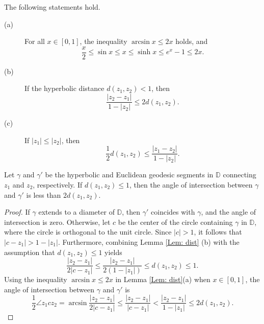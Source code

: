 \documentclass[10pt,a4paper]{amsart}
\begin{document}
\begin{lemma}\label{Lem: dist}
The following statements hold.
\begin{description}
\item[(a)]
For all $x\in[0, 1]$, the inequality $\arcsin x\leq 2x$ holds, and 
\begin{equation*}
\frac{x}{2}\leq \sin x \leq x\leq \sinh x\leq e^x - 1\leq 2x.
\end{equation*}
\item[(b)]
If the hyperbolic distance $d(z_1, z_2)<1$, then
\begin{equation*}
\frac{|z_2-z_1|}{1-|z_2|} \leq 2d(z_1, z_2).
\end{equation*}

\item[(c)]
If $|z_1|\leq |z_2|$, then
\begin{equation*}
\frac{1}{2}d(z_1, z_2) \leq \frac{|z_1-z_2|}{1-|z_2|}.
\end{equation*}
\end{description}
\end{lemma}

\begin{lemma}\label{angle}
Let $\gamma$ and $\gamma'$ be the hyperbolic and Euclidean geodesic segments in $\mathbb{D}$ connecting $z_1$ and $z_2$, respectively.
If $d(z_1, z_2)\leq 1$, then the angle of intersection between $\gamma$ and $\gamma'$ is less than $2d(z_1, z_2)$.
\end{lemma}

\begin{proof}
If $\gamma$ extends to a diameter of $\mathbb{D}$, then $\gamma'$ coincides with $\gamma$, and the angle of intersection is zero.
Otherwise, let $c$ be the center of the circle containing $\gamma$ in $\mathbb{D}$, where the circle is orthogonal to the unit circle.
Since $|c|>1$, it follows that $|c-z_1|>1-|z_1|$.
Furthermore, combining Lemma \ref{Lem: dist} (b) with the assumption that $d(z_1,z_2)\leq 1$ yields
\begin{equation*}
\frac{|z_2-z_1|}{2|c-z_1|}
\leq \frac{|z_2-z_1|}{2(1-|z_1|)}
\leq d(z_1, z_2)\leq 1.
\end{equation*}
Using the inequality $\arcsin x \leq 2x$ in Lemma \ref{Lem: dist}(a) when $x\in [0, 1]$, the angle of intersection between $\gamma$ and $\gamma'$ is
\begin{equation*}
\frac{1}{2}\angle z_1cz_2
=\arcsin \frac{|z_2-z_1|}{2|c-z_1|}
\leq \frac{|z_2-z_1|}{|c-z_1|}
<\frac{|z_2-z_1|}{1-|z_1|}
\leq 2d(z_1,z_2).
\end{equation*}
\end{proof}
\end{document}
